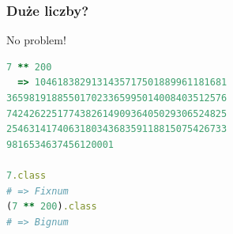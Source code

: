 
\begin{frame}[fragile]
\frametitle{Duże liczby?}
\begin{block}{No problem!}
\begin{lstlisting}[language=Ruby]
7 ** 200
  => 1046183829131435717501889961181681
365981918855017023365995014008403512576
742426225177438261490936405029306524825
254631417406318034368359118815075426733
9816534637456120001

7.class
# => Fixnum
(7 ** 200).class
# => Bignum
\end{lstlisting}
\end{block}
\end{frame}




